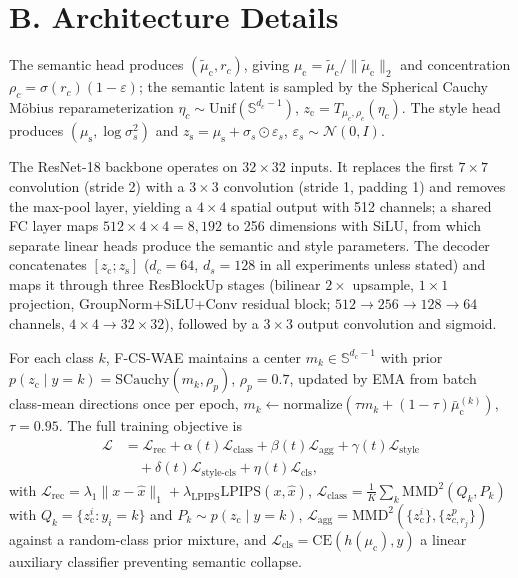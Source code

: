 \documentclass[letterpaper]{article} %
\newcommand{\ours}{F-CS-WAE}
\newcommand{\zc}{z_{\mathrm{c}}}
\newcommand{\zs}{z_{\mathrm{s}}}
\newcommand{\muc}{\mu_{\mathrm{c}}}
\newcommand{\mus}{\mu_{\mathrm{s}}}
\newcommand{\Sph}{\mathbb{S}}
\newcommand{\MMD}{\mathrm{MMD}}
\newcommand{\CE}{\mathrm{CE}}
\newcommand{\SCauchy}{\mathrm{SCauchy}}
\begin{document}
\section{B. Architecture Details}

The semantic head produces $(\tilde\muc,r_c)$, giving
$\muc=\tilde\muc/\|\tilde\muc\|_2$ and concentration
$\rho_c=\sigma(r_c)(1-\varepsilon)$; the semantic latent is sampled by the
Spherical Cauchy M\"obius reparameterization
$\eta_c\sim\mathrm{Unif}(\Sph^{d_c-1})$, $\zc=T_{\muc,\rho_c}(\eta_c)$. The
style head produces $(\mus,\log\sigma_s^2)$ and $\zs=\mus+\sigma_s\odot
\varepsilon_s$, $\varepsilon_s\sim\mathcal N(0,I)$.

The ResNet-18 backbone operates on $32\times32$ inputs. It replaces the first $7\times7$
convolution (stride 2) with a $3\times3$ convolution (stride 1, padding 1)
and removes the max-pool layer, yielding a $4\times4$ spatial output with 512
channels; a shared FC layer maps $512\times4\times4{=}8{,}192$ to 256
dimensions with SiLU, from which separate linear heads produce the semantic
and style parameters. The decoder concatenates $[\zc;\zs]$ ($d_c{=}64$,
$d_s{=}128$ in all experiments unless stated) and maps it through three
ResBlockUp stages (bilinear $2\times$ upsample, $1\times1$ projection,
GroupNorm+SiLU+Conv residual block; $512{\to}256{\to}128{\to}64$ channels,
$4\times4\to32\times32$), followed by a $3\times3$ output convolution and
sigmoid.

For each class $k$, \ours{} maintains a center $m_k\in\Sph^{d_c-1}$ with
prior $p(\zc\mid y{=}k)=\SCauchy(m_k,\rho_p)$, $\rho_p{=}0.7$, updated by EMA
from batch class-mean directions once per epoch,
$m_k\leftarrow\mathrm{normalize}(\tau m_k+(1-\tau)\bar\muc^{(k)})$,
$\tau{=}0.95$. The full training objective is
\begin{align*}
  \mathcal{L} &= \mathcal{L}_{\mathrm{rec}} + \alpha(t)\mathcal{L}_{\mathrm{class}}
   + \beta(t)\mathcal{L}_{\mathrm{agg}} + \gamma(t)\mathcal{L}_{\mathrm{style}}\\
  &\quad + \delta(t)\mathcal{L}_{\mathrm{style\text{-}cls}} + \eta(t)\mathcal{L}_{\mathrm{cls}},
\end{align*}
with
$\mathcal{L}_{\mathrm{rec}}=\lambda_1\|x-\hat x\|_1+\lambda_{\mathrm{LPIPS}}\mathrm{LPIPS}(x,\hat x)$,
$\mathcal{L}_{\mathrm{class}}=\frac1K\sum_k\MMD^2(Q_k,P_k)$ with
$Q_k=\{\zc^i{:}y_i{=}k\}$ and $P_k\sim p(\zc\mid y{=}k)$,
$\mathcal{L}_{\mathrm{agg}}=\MMD^2(\{\zc^i\},\{z_{c,r_j}^p\})$ against a
random-class prior mixture, and $\mathcal{L}_{\mathrm{cls}}=\CE(h(\muc),y)$ a
linear auxiliary classifier preventing semantic collapse.
\end{document}
